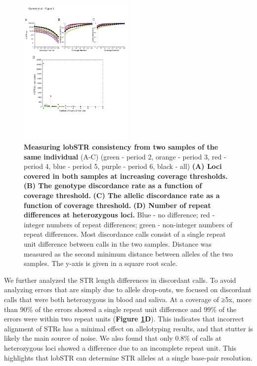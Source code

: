 \begin{figure}[h!]
\centering
\label{fig:lobfig3}
\includegraphics[width=0.5\textwidth]{Figures/Chapter2/Fig3.pdf}
\caption{\textbf{Measuring lobSTR consistency from two samples of the same individual} (A-C) (green - period 2, orange - period 3, red - period 4, blue - period 5, purple - period 6, black - all) \textbf{(A) Loci covered in both samples at increasing coverage thresholds.} \textbf{(B) The genotype discordance rate as a function of coverage threshold.} \textbf{(C) The allelic discordance rate as a function of coverage threshold.} \textbf{(D) Number of repeat differences at heterozygous loci.} Blue - no difference; red - integer numbers of repeat differences; green - non-integer numbers of repeat differences. Most discordance calls consist of a single repeat unit difference between calls in the two samples. Distance was measured as the second minimum distance between alleles of the two samples. The y-axis is given in a square root scale.}
\end{figure}

We further analyzed the STR length differences in discordant calls. To avoid analyzing errors that are simply due to allele drop-outs, we focused on discordant calls that were both heterozygous in blood and saliva. At a coverage of ≥5x, more than 90\% of the errors showed a single repeat unit difference and 99\% of the errors were within two repeat units (\textbf{Figure \ref{fig:lobfig3}D}). This indicates that incorrect alignment of STRs has a minimal effect on allelotyping results, and that stutter is likely the main source of noise. We also found that only 0.8\% of calls at heterozygous loci showed a difference due to an incomplete repeat unit. This highlights that lobSTR can determine STR alleles at a single base-pair resolution. 

